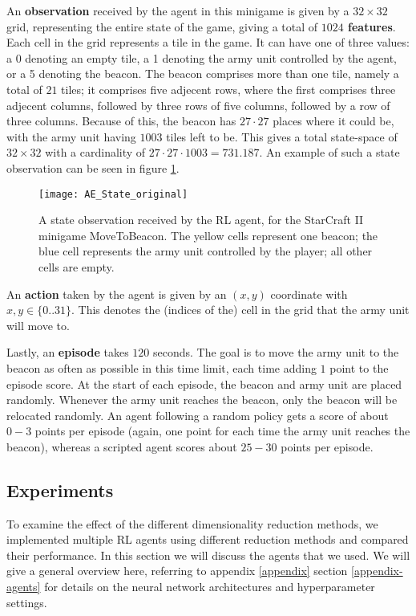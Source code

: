 An \textbf{observation} received by the agent in this minigame is given by a $32 \times 32$ grid, representing the entire state of the game,  giving a total of \textbf{$1024$ features}. Each cell in the grid represents a tile in the game. It can have one of three values: a 0 denoting an empty tile, a 1 denoting the army unit controlled by the agent, or a 5 denoting the beacon. The beacon comprises more than one tile, namely a total of $21$ tiles; it comprises five adjecent rows, where the first comprises three adjecent columns, followed by three rows of five columns, followed by a row of three columns. Because of this, the beacon has $27 \cdot 27$ places where it could be, with the army unit having $1003$ tiles left to be. This gives  a total state-space of $32 \times 32$ with a cardinality of $27 \cdot 27 \cdot 1003 = 731.187$. An example of such a state observation can be seen in figure \ref{fig:state_example}.

\begin{figure}[h]
    \centering
    \texttt{[image: AE\_State\_original]}
    \caption{A state observation received by the RL agent, for the StarCraft II minigame MoveToBeacon. The yellow cells represent one beacon; the blue cell represents the army unit controlled by the player; all other cells are empty.}
    \label{fig:state_example}
\end{figure}

An \textbf{action} taken by the agent is given by an $(x,y)$ coordinate with $x,y \in \{0 .. 31\}$. This denotes the (indices of the) cell in the grid that the army unit will move to.

Lastly, an \textbf{episode} takes $120$ seconds. The goal is to move the army unit to the beacon as often as possible in this time limit, each time adding $1$ point to the episode score. At the start of each episode, the beacon and army unit are placed randomly. Whenever the army unit reaches the beacon, only the beacon will be relocated randomly. An agent following a random policy gets a score of about $0-3$ points per episode (again, one point for each time the army unit reaches the beacon), whereas a scripted agent scores about $25-30$ points per episode.

\subsection{Experiments}\label{research-exp}
To examine the effect of the different dimensionality reduction methods, we implemented multiple RL agents using different reduction methods and compared their performance. In this section we will discuss the agents that we used. We will give a general overview here, referring to appendix \ref{appendix} section \ref{appendix-agents} for details on the neural network architectures and hyperparameter settings. 

